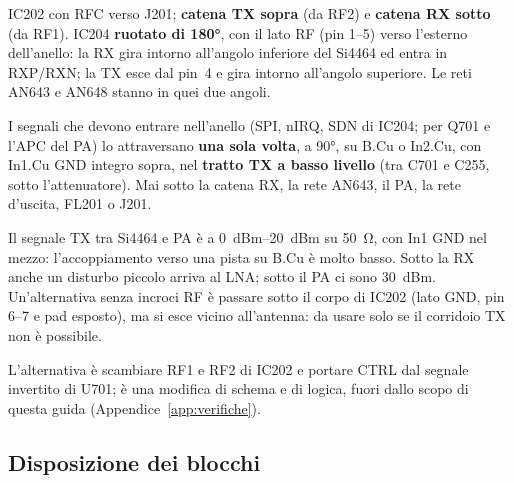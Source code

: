 \documentclass[a4paper,10pt]{article}
\newcommand{\net}[1]{\texttt{\detokenize{#1}}}
\newcounter{regola}
\begin{document}
\begin{regola}[orientamento di IC202 e IC204]
IC202 con RFC verso J201; \textbf{catena TX sopra} (da RF2) e \textbf{catena RX sotto} (da RF1). IC204
\textbf{ruotato di \ang{180}}, con il lato RF (pin 1--5) verso l'esterno dell'anello: la RX gira intorno
all'angolo inferiore del Si4464 ed entra in RXP/RXN; la TX esce dal pin~4 e gira intorno all'angolo
superiore. Le reti AN643 e AN648 stanno in quei due angoli.
\end{regola}

\begin{regola}
I segnali che devono entrare nell'anello (SPI, nIRQ, SDN di IC204; \net{EN_TX_ANT_SW} per Q701 e l'APC
del PA) lo attraversano \textbf{una sola volta}, a \ang{90}, su B.Cu o In2.Cu, con In1.Cu GND integro
sopra, nel \textbf{tratto TX a basso livello} (tra C701 e C255, sotto l'attenuatore). Mai sotto la catena
RX, la rete AN643, il PA, la rete d'uscita, FL201 o J201.
\end{regola}

\begin{perche}
Il segnale TX tra Si4464 e PA è a \SIrange{0}{20}{dBm} su \SI{50}{\ohm}, con In1 GND nel mezzo:
l'accoppiamento verso una pista su B.Cu è molto basso. Sotto la RX anche un disturbo piccolo arriva al
LNA; sotto il PA ci sono \SI{30}{dBm}. Un'alternativa senza incroci RF è passare sotto il corpo di IC202
(lato GND, pin 6--7 e pad esposto), ma si esce vicino all'antenna: da usare solo se il corridoio TX non è
possibile.
\end{perche}

L'alternativa è scambiare RF1 e RF2 di IC202 e portare CTRL dal segnale invertito di U701; è una modifica
di schema e di logica, fuori dallo scopo di questa guida (Appendice~\ref{app:verifiche}).

\subsection{Disposizione dei blocchi}
\end{document}

